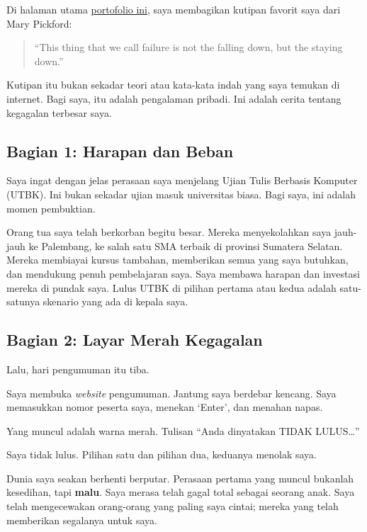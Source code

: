\documentclass[
  letterpaper,
  DIV=11,
  numbers=noendperiod]{scrreprt}
\begin{document}
Di halaman utama
\hyperref[uts-3-kisah-jatuh-di-garis-start-dan-menolak-untuk-tetap-di-bawah]{portofolio
ini}, saya membagikan kutipan favorit saya dari Mary Pickford:

\begin{quote}
``This thing that we call failure is not the falling down, but the
staying down.''
\end{quote}

Kutipan itu bukan sekadar teori atau kata-kata indah yang saya temukan
di internet. Bagi saya, itu adalah pengalaman pribadi. Ini adalah cerita
tentang kegagalan terbesar saya.

\subsection{Bagian 1: Harapan dan
Beban}\label{bagian-1-harapan-dan-beban}

Saya ingat dengan jelas perasaan saya menjelang Ujian Tulis Berbasis
Komputer (UTBK). Ini bukan sekadar ujian masuk universitas biasa. Bagi
saya, ini adalah momen pembuktian.

Orang tua saya telah berkorban begitu besar. Mereka menyekolahkan saya
jauh-jauh ke Palembang, ke salah satu SMA terbaik di provinsi Sumatera
Selatan. Mereka membiayai kursus tambahan, memberikan semua yang saya
butuhkan, dan mendukung penuh pembelajaran saya. Saya membawa harapan
dan investasi mereka di pundak saya. Lulus UTBK di pilihan pertama atau
kedua adalah satu-satunya skenario yang ada di kepala saya.

\subsection{Bagian 2: Layar Merah
Kegagalan}\label{bagian-2-layar-merah-kegagalan}

Lalu, hari pengumuman itu tiba.

Saya membuka \emph{website} pengumuman. Jantung saya berdebar kencang.
Saya memasukkan nomor peserta saya, menekan `Enter', dan menahan napas.

Yang muncul adalah warna merah. Tulisan ``Anda dinyatakan TIDAK
LULUS\ldots{}''

Saya tidak lulus. Pilihan satu dan pilihan dua, keduanya menolak saya.

Dunia saya seakan berhenti berputar. Perasaan pertama yang muncul
bukanlah kesedihan, tapi \textbf{malu}. Saya merasa telah gagal total
sebagai seorang anak. Saya telah mengecewakan orang-orang yang paling
saya cintai; mereka yang telah memberikan segalanya untuk saya.
\end{document}
